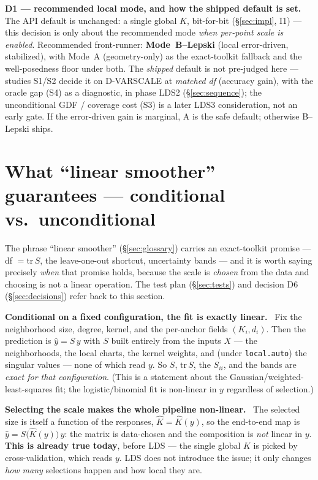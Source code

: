 \documentclass[11pt]{article}
\newcommand{\field}[1]{\smallskip\noindent\textbf{\textsf{#1.}}\ }
\newcommand{\code}[1]{\texttt{#1}}
\begin{document}
\begin{decide}
\textbf{D1 --- recommended local mode, and how the shipped default is set.} The API
default is unchanged: a single global $K$, bit-for-bit (\S\ref{sec:impl}, I1) --- this
decision is only about the recommended mode \emph{when per-point scale is enabled}.
Recommended front-runner: \textbf{Mode~B--Lepski} (local error-driven, stabilized), with
Mode~A (geometry-only) as the exact-toolkit fallback and the well-posedness floor under
both. The \emph{shipped} default is not pre-judged here --- studies S1/S2 decide it on
D-VARSCALE at \emph{matched df} (accuracy gain), with the oracle gap (S4) as a diagnostic,
in phase LDS2 (\S\ref{sec:sequence}); the unconditional GDF / coverage cost (S3) is a later
LDS3 consideration, not an early gate. If the error-driven gain is marginal, A is the safe
default; otherwise B--Lepski ships.
\end{decide}

\section{What ``linear smoother'' guarantees --- conditional vs.\ unconditional}\label{sec:conditional}

The phrase ``linear smoother'' (\S\ref{sec:glossary}) carries an exact-toolkit promise
--- df $=\mathrm{tr}\,S$, the leave-one-out shortcut, uncertainty bands --- and it is
worth saying precisely \emph{when} that promise holds, because the scale is
\emph{chosen} from the data and choosing is not a linear operation. The test plan
(\S\ref{sec:tests}) and decision D6 (\S\ref{sec:decisions}) refer back to this section.

\field{Conditional on a fixed configuration, the fit is exactly linear}
Fix the neighborhood size, degree, kernel, and the per-anchor fields $(K_i,d_i)$. Then
the prediction is $\hat y=S\,y$ with $S$ built entirely from the inputs $X$ --- the
neighborhoods, the local charts, the kernel weights, and (under \code{local.auto}) the
singular values --- none of which read $y$. So $S$, $\mathrm{tr}\,S$, the $S_{ii}$, and
the bands are \emph{exact for that configuration}. (This is a statement about the
Gaussian/weighted-least-squares fit; the logistic/binomial fit is non-linear in $y$
regardless of selection.)

\field{Selecting the scale makes the whole pipeline non-linear}
The selected size is itself a function of the responses, $\hat K=\hat K(y)$, so the
end-to-end map is $\hat y=S\big(\hat K(y)\big)\,y$: the matrix is data-chosen and the
composition is \emph{not} linear in $y$. \textbf{This is already true today}, before
LDS --- the single global $K$ is picked by cross-validation, which reads $y$. LDS does
not introduce the issue; it only changes \emph{how many} selections happen and how
local they are.
\end{document}
